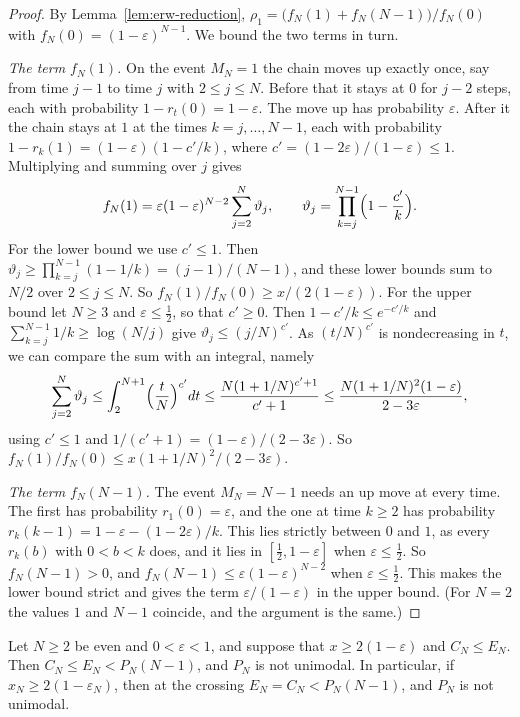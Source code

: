 \begin{proof}
By Lemma~\ref{lem:erw-reduction}, $\rho_1=\bigl(f_N(1)+f_N(N-1)\bigr)/f_N(0)$
with $f_N(0)=(1-\varepsilon)^{N-1}$. We bound the two terms in turn.

\emph{The term $f_N(1)$.} On the event $M_N=1$ the chain moves up exactly
once, say from time $j-1$ to time $j$ with $2\le j\le N$. Before that it
stays at $0$ for $j-2$ steps, each with probability
$1-r_t(0)=1-\varepsilon$. The move up has probability $\varepsilon$. After it
the chain stays at $1$ at the times $k=j,\dots,N-1$, each with probability
$1-r_k(1)=(1-\varepsilon)(1-c'/k)$, where
$c'=(1-2\varepsilon)/(1-\varepsilon)\le1$. Multiplying and summing over
$j$ gives
\[
 f_N(1)=\varepsilon(1-\varepsilon)^{N-2}\sum_{j=2}^N\vartheta_j,\qquad
 \vartheta_j=\prod_{k=j}^{N-1}\Bigl(1-\frac{c'}k\Bigr).
\]
For the lower bound we use $c'\le1$. Then
$\vartheta_j\ge\prod_{k=j}^{N-1}(1-1/k)=(j-1)/(N-1)$, and these lower bounds sum to
$N/2$ over $2\le j\le N$. So $f_N(1)/f_N(0)\ge x/(2(1-\varepsilon))$. For
the upper bound let $N\ge3$ and $\varepsilon\le\frac12$, so that $c'\ge0$. Then
$1-c'/k\le e^{-c'/k}$ and $\sum_{k=j}^{N-1}1/k\ge\log(N/j)$
give $\vartheta_j\le(j/N)^{c'}$. As $(t/N)^{c'}$ is nondecreasing in $t$, we can compare
the sum with an integral, namely
\[
 \sum_{j=2}^N\vartheta_j\le\int_2^{N+1}\Bigl(\frac tN\Bigr)^{c'} dt
 \le\frac{N(1+1/N)^{c'+1}}{c'+1}\le\frac{N(1+1/N)^2(1-\varepsilon)}{2-3\varepsilon},
\]
using $c'\le1$ and $1/(c'+1)=(1-\varepsilon)/(2-3\varepsilon)$. So
$f_N(1)/f_N(0)\le x(1+1/N)^2/(2-3\varepsilon)$.

\emph{The term $f_N(N-1)$.} The event $M_N=N-1$ needs an up move at every
time. The first has probability $r_1(0)=\varepsilon$, and the one at time
$k\ge2$ has probability $r_k(k-1)=1-\varepsilon-(1-2\varepsilon)/k$. This lies
strictly between $0$ and $1$, as every $r_k(b)$ with $0<b<k$ does, and it lies in
$[\frac12,1-\varepsilon]$ when $\varepsilon\le\frac12$. So $f_N(N-1)>0$, and
$f_N(N-1)\le\varepsilon(1-\varepsilon)^{N-2}$ when $\varepsilon\le\frac12$. This makes
the lower bound strict and gives the term $\varepsilon/(1-\varepsilon)$ in the upper bound.
(For $N=2$ the values $1$ and $N-1$ coincide, and the argument is the same.)
\end{proof}

\begin{corollary}\label{cor:dip}
Let $N\ge2$ be even and $0<\varepsilon<1$, and suppose that $x\ge2(1-\varepsilon)$
and $C_N\le E_N$. Then $C_N\le E_N<P_N(N-1)$, and $P_N$ is not unimodal. In
particular, if $x_N\ge2(1-\varepsilon_N)$, then at the crossing $E_N=C_N<P_N(N-1)$, and
$P_N$ is not unimodal.
\end{corollary}

